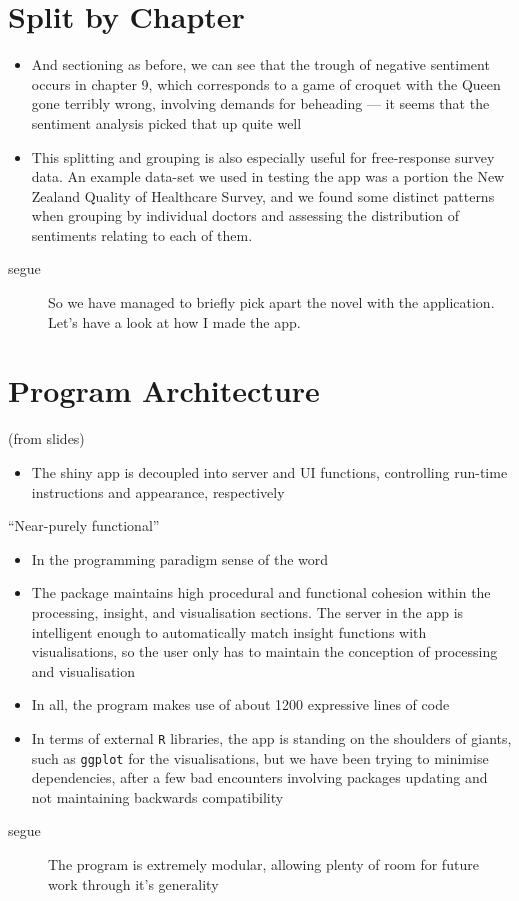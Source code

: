 \documentclass[11pt,a4paper]{article}
\begin{document}
\section{Split by Chapter}
\label{sec:split-chapter}
\begin{itemize}
\item And sectioning as before, we can see that the trough of negative
  sentiment occurs in chapter 9, which corresponds to a game of
  croquet with the Queen gone terribly wrong, involving demands for
  beheading --- it seems that the sentiment analysis picked that up
  quite well
\item This splitting and grouping is also especially useful for
  free-response survey data. An example data-set we used in testing the
  app was a portion the New Zealand Quality of Healthcare Survey, and
  we found some distinct patterns when grouping by individual doctors
  and assessing the distribution of sentiments relating to each of
  them.
\end{itemize}
\begin{description}
\item[segue] So we have managed to briefly pick apart the novel with
  the application. Let's have a look at how I made the app.
\end{description}

\section{Program Architecture}
\label{sec:program-architecture}
(from slides)\\
\begin{itemize}
\item The shiny app is decoupled into server and UI functions,
  controlling run-time instructions and appearance, respectively
\end{itemize}
\enquote{Near-purely functional}
\begin{itemize}
\item In the programming paradigm sense of the word
\item The package maintains high procedural and functional cohesion
  within the processing, insight, and visualisation sections. The
  server in the app is intelligent enough to automatically match
  insight functions with visualisations, so the user only has to
  maintain the conception of processing and visualisation
\item In all, the program makes use of about 1200 expressive lines of
  code
\item In terms of external \texttt{R} libraries, the app is standing
  on the shoulders of giants, such as \texttt{ggplot} for the
  visualisations, but we have been trying to minimise dependencies,
  after a few bad encounters involving packages updating and not
  maintaining backwards compatibility
\end{itemize}
\begin{description}
\item[segue] The program is extremely modular, allowing plenty of room
  for future work through it's generality
\end{description}
\end{document}
